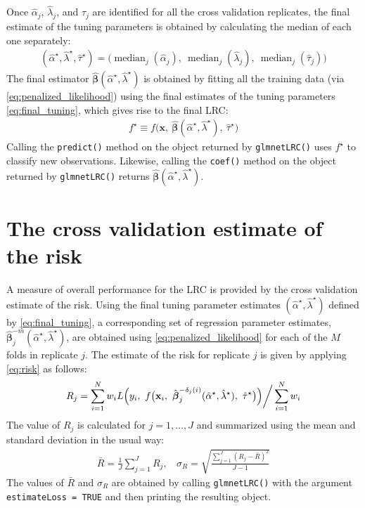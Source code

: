 \documentclass{article}
\DeclareMathOperator*{\median}{median}
\begin{document}
Once $\hat\alpha_j$, $\hat\lambda_j$, and $\hat\tau_j$ are identified for all the cross validation replicates, 
the final estimate of the tuning parameters is obtained by calculating the median of each one separately:
\begin{align}
\label{eq:final_tuning}
(\hat\alpha^\star,\hat\lambda^\star,\hat\tau^\star) = \bigl(\median_j(\hat\alpha_j), ~\median_j(\hat\lambda_j),
  ~\median_j(\hat\tau_j) \bigr)
\end{align}
\noindent The final estimator $\hat{\boldsymbol\beta}(\hat\alpha^\star,\hat\lambda^\star)$ is obtained by fitting all the training 
data (via \eqref{eq:penalized_likelihood}) using the final estimates of the tuning parameters \eqref{eq:final_tuning}, 
which gives rise to the final LRC:
\begin{align}
f^\star \equiv f \bigl(\mathbf{x}, ~\hat{\boldsymbol{\beta}}(\hat\alpha^\star, \hat\lambda^\star), ~\hat\tau^\star \bigr)
\end{align}
\noindent Calling the {\tt predict()} method on the object returned by {\tt glmnetLRC()} uses $f^\star$ to classify
new observations.  Likewise, calling the {\tt coef()} method on the object returned by {\tt glmnetLRC()} returns 
$\hat{\boldsymbol\beta}(\hat\alpha^\star,\hat\lambda^\star)$.

\section{The cross validation estimate of the risk}

A measure of overall performance for the LRC is provided by the cross validation estimate of the risk. 
Using the final tuning parameter estimates $(\hat\alpha^\star,\hat\lambda^\star)$ defined by \eqref{eq:final_tuning}, 
a corresponding set of regression parameter estimates, $\hat{\boldsymbol\beta}_j^{-m}(\hat\alpha^\star,\hat\lambda^\star)$, 
are obtained using \eqref{eq:penalized_likelihood} 
for each of the $M$ folds in replicate $j$.  The estimate of the risk for replicate $j$ is given by applying \eqref{eq:risk} 
as follows:
\begin{align}
\label{eq:final_risk_j}
R_j  = \sum_{i=1}^N w_i L \Bigl(y_i, ~ f\bigl(\mathbf{x}_i,
~\hat{\boldsymbol\beta}_j^{-\delta_j(i)}(\hat\alpha^\star,\hat\lambda^\star),  ~\hat\tau^\star \bigr) \Bigr) \bigg/ \sum_{i=1}^N w_i
\end{align}
The value of $R_j$ is calculated for $j = 1,\ldots,J$ and summarized using the mean and standard deviation
in the usual way:
\begin{align}
\bar{R} = \frac{1}{J}\sum_{j=1}^J R_j,  ~~~~ \sigma_R = \sqrt{\frac{\sum_{j=1}^J(R_j - \bar{R})^2}{J-1}}
\end{align}
The values of $\bar{R}$ and $\sigma_R$ are obtained by calling {\tt glmnetLRC()} with the argument {\tt estimateLoss = TRUE}
and then printing the resulting object.



\end{document}
